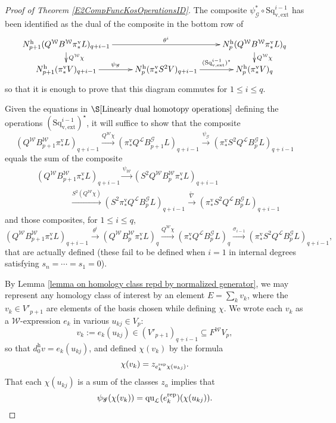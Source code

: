 \documentclass[11pt]{amsart} \renewcommand{\baselinestretch}{1.2}
\theoremstyle{plain}
\numberwithin{equation}{section} %
\theoremstyle{plain}
\numberwithin{equation}{chapter} %
\renewcommand{\to}{\longrightarrow}
\newcommand{\from}{\longleftarrow}
\newcommand{\scrG}{\mathscr{G}}
\newcommand{\calL}{\mathcal{L}}
\newcommand{\calw}{\mathcal{W}}
\newcommand{\call}{\mathcal{L}}
\newcommand{\BSW}{{\scrG}}
\newcommand{\BSWres}{B^\BSW}%
\newcommand{\quadratic}{\mathrm{qu}}
\newcommand{\vExtCohOp}{\mathrm{Sq}_\mathrm{v,ext}}
\newcommand{\uver}{^\mathrm{v}}
\newcommand{\uhor}{^\mathrm{h}}
\begin{document}
\begin{Operations in composite functor spectral sequences}
\begin{proof}[Proof of Theorem \ref{E2CompFuncKosOperationsID}]
The composite $\psi_\BSW^*\circ\vExtCohOp^{i-1}$ has been identified as the dual of the composite in the bottom row of
\[\xymatrix@R=4mm{
N\uhor_{p+1}(Q^{\calw}B^{\calw}\pi\uver_*L)_{q+i-1}\ar[rr]^-{\theta^i}
\ar[d]^-{Q^{\calw}\chi}
&%
&%
N\uhor_p(Q^{\calw}B^{\calw}\pi\uver_*L)_q\ar[d]^-{Q^{\calw}\chi}
\\%
N\uhor_{p+1}(\pi\uver_*V)_{q+i-1}\ar[r]^-{\psi_\BSW}
&%
N\uhor_{p}(\pi\uver_*S^2V)_{q+i-1}\ar[r]^-{(\vExtCohOp^{i-1})^\star}
&%
N\uhor_p(\pi\uver_*V)_q%
}\]
so that it is enough to prove that this diagram commutes for $1\leq i\leq q$.

Given the equations in $\S\ref{Linearly dual homotopy operations}$ defining the operations $(\vExtCohOp^{i-1})^\star$, it will suffice to show that the composite
\[(Q^{\calw}B^{\calw}_{p+1}\pi\uver_*L)_{q+i-1}\overset{Q^{\calw}\chi}{\to}(\pi\uver_*Q^{\calL}\BSWres_{p+1}L)_{q+i-1}\overset{\psi_\BSW}{\to}(\pi\uver_*S^2Q^{\calL}\BSWres_pL)_{q+i-1}\]
equals the sum of the composite
\[\begin{split}
&(Q^{\calw}B^{\calw}_{p+1}\pi\uver_* L)_{q+i-1}\overset{\psi_{\calw}}{\to}(S^2Q^{\calw}B^{\calw}_{p}\pi\uver_* L)_{q+i-1}\\
 &\qquad\qquad \overset{S^2(Q^{\calw}\chi)}{\to}
(S^2\pi\uver_*Q^{\call}\BSWres_pL)_{q+i-1}\overset{\widetilde{\nabla}}{\to}
(\pi\uver_*S^2Q^{\calL}\BSWres_{p}L)_{q+i-1}
\end{split}\]
and those composites, for $1\leq i \leq q$,
\[(Q^{\calw}B^{\calw}_{p+1}\pi\uver_* L)_{q+i-1}\overset{\theta^i}{\to} (Q^{\calw}B^{\calw}_{p}\pi\uver_* L)_q\overset{Q^{\calw}\chi}{\to} (\pi\uver_*Q^{\call}\BSWres_{p}L)_q\overset{\sigma_{i-1}}{\to} (\pi\uver_*S^2Q^{\calL}\BSWres_{p}L)_{q+i-1},\]
that are actually defined (these fail to be defined when $i=1$ in internal degrees satisfying $s_n=\cdots =s_1=0$). 


By Lemma \ref{lemma on homology class repd by normalized generator}, we may represent any homology class of interest by an element $E=\sum_kv_k$, where the $v_k\in V'_{p+1}$ are elements of the basis chosen while defining $\chi$. We wrote each $v_k$ as a $\calw$-expression $e_k$ in various $u_{kj}\in V_{p}$:
\[v_k:=e_{k}(u_{kj})\in (V'_{p+1})_{q+i-1}\subseteq F^{\calw}V_p,\]
so that $d\uhor_0v=e_k(u_{kj})$, and  defined  $\chi(v_k)$ by the formula 
\[\chi(v_k)=z_{e_{k}^\textup{rep}\chi(u_{kj})}.\]
That each $\chi(u_{kj})$ is a sum of the classes $z_a$ implies that 
\[\psi_\BSW(\chi(v_k))=\quadratic_{\calL}(e_{k}^\textup{rep})(\chi(u_{kj})).\]


\end{proof}
\end{Operations in composite functor spectral sequences}
\end{document}
